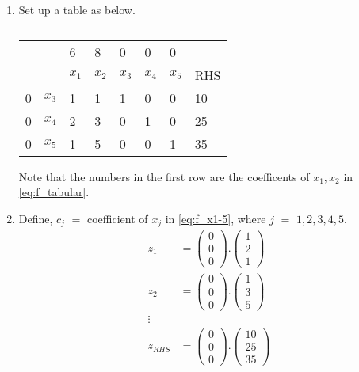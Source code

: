 \documentclass[journal,12pt,twocolumn]{IEEEtran}
\begin{document}
\begin{enumerate}[1.]
\item Set up a table as below.
\begin{table}[!h]
\begin{center}
\begin{tabular}{l  l | l l l l l | l  }
                 & & 6 & 8 & 0 & 0 & 0 &  \\
                 & & $x_1$ & $x_2$ & $x_3$ & $x_4$ & $x_5$  & RHS  \\
\hline
0 & $x_3$ & 1 & 1 & 1 & 0 & 0 & 10   \\
0 & $x_4$ & 2 & 3 & 0 & 1 & 0 & 25  \\
0 & $x_5$ & 1 & 5 & 0 & 0 & 1 & 35 \\
\end{tabular}
\end{center}
\caption{}
\end{table}
Note that the numbers in the first row are the coefficents of $x_1,x_2$ in \eqref{eq:f_tabular}.
\item Define, $c_j$ $=$ coefficient of $x_j$ in \eqref{eq:f_x1-5}, where $j$ $=$ $1,2,3,4,5$.
\begin{align}
z_1 &= 
\begin{pmatrix}
0
\\
0
\\
0
\end{pmatrix}
.
\begin{pmatrix}
1
\\
2
\\
1
\end{pmatrix}
\\
z_2 &= 
\begin{pmatrix}
0
\\
0
\\
0
\end{pmatrix}
.
\begin{pmatrix}
1
\\
3
\\
5
\end{pmatrix}
\\
\vdots \nonumber
\\
z_{RHS} &= 
\begin{pmatrix}
0
\\
0
\\
0
\end{pmatrix}
.
\begin{pmatrix}
10
\\
25
\\
35
\end{pmatrix}

\end{align}
\end{enumerate}
\end{document}
